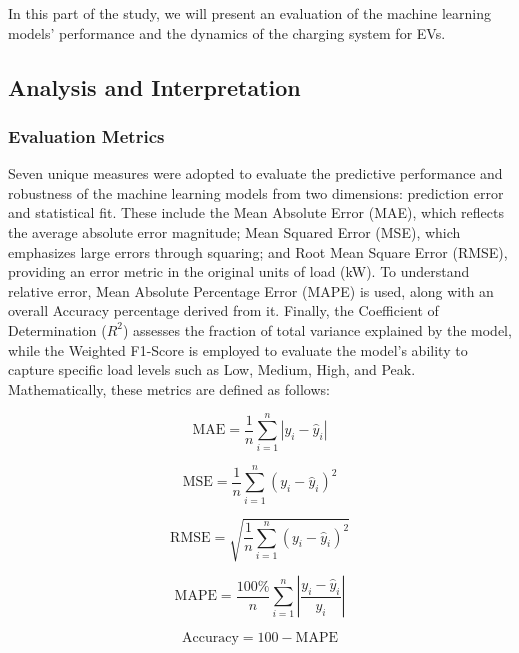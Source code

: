 \documentclass{thesis-library}
\begin{document}
{In this part of the study, we will present an evaluation of the machine learning models' performance and the dynamics of the charging system for EVs.

\subsection{Analysis and Interpretation}

\subsubsection{Evaluation Metrics}

Seven unique measures were adopted to evaluate the predictive performance and robustness of the machine learning models from two dimensions: prediction error and statistical fit. These include the Mean Absolute Error (MAE), which reflects the average absolute error magnitude; Mean Squared Error (MSE), which emphasizes large errors through squaring; and Root Mean Square Error (RMSE), providing an error metric in the original units of load (kW). To understand relative error, Mean Absolute Percentage Error (MAPE) is used, along with an overall Accuracy percentage derived from it. Finally, the Coefficient of Determination ($R^2$) assesses the fraction of total variance explained by the model, while the Weighted F1-Score is employed to evaluate the model's ability to capture specific load levels such as Low, Medium, High, and Peak. Mathematically, these metrics are defined as follows:

\begin{equation}
    \text{MAE} = \frac{1}{n} \sum_{i=1}^{n} |y_i - \hat{y}_i|
\end{equation}

\begin{equation}
    \text{MSE} = \frac{1}{n} \sum_{i=1}^{n} (y_i - \hat{y}_i)^2
\end{equation}

\begin{equation}
    \text{RMSE} = \sqrt{\frac{1}{n} \sum_{i=1}^{n} (y_i - \hat{y}_i)^2}
\end{equation}

\begin{equation}
    \text{MAPE} = \frac{100\%}{n} \sum_{i=1}^{n} \left| \frac{y_i - \hat{y}_i}{y_i} \right|
\end{equation}

\begin{equation}
    \text{Accuracy} = 100 - \text{MAPE}
\end{equation}

}
\end{document}
